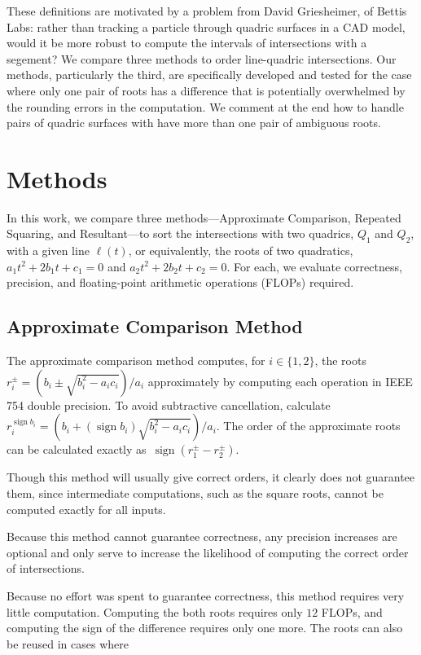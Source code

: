 \documentclass{cccg16}
\DeclareMathOperator{\sign}{sign}
\begin{document}
These definitions are motivated by a problem from David Griesheimer, of Bettis Labs:  rather than tracking a particle through quadric surfaces in a CAD model, would it be more robust to compute the intervals of intersections with a segement?  
We compare three methods to order line-quadric intersections.
Our methods, particularly the third,  are specifically 
developed and tested for the case where only one pair of roots has a difference
that is potentially overwhelmed by the rounding errors in the
computation. We comment at the end how to handle pairs of quadric
surfaces with have more than one pair of ambiguous roots.

\section{Methods}
In this work, we compare three  methods---Approximate Comparison,
Repeated Squaring, and Resultant---to sort the intersections with two quadrics, $Q_1$ and $Q_2$, with a given line $\ell(t)$, or equivalently, the roots of two quadratics, $a_1t^2+2b_1t+c_1=0$ and $a_2t^2+2b_2t+c_2=0$.  
For each, we evaluate correctness, precision, and floating-point arithmetic operations (FLOPs) required.

\subsection{Approximate Comparison Method}
The approximate comparison method computes, for $i\in\{1, 2\}$, the
roots~$r_i^\pm=({b_i\pm\sqrt{b_i^2-a_ic_i}})/{a_i}$ approximately by
computing each operation in IEEE 754 double precision.  To avoid subtractive cancellation, calculate
$r_i^{\sign b_i}=({b_i+(\sign{b_i})\sqrt{b_i^2-a_ic_i}})/{a_i}.$
The order of the approximate roots can be
calculated exactly as~$\sign(r_1^\pm-r_2^\pm)$.


Though this method will usually give correct orders, it clearly does
not guarantee them, since intermediate computations, such as the
square roots, cannot be computed exactly for all inputs.

Because this method cannot guarantee correctness, any precision
increases are optional and only serve to increase the likelihood of
computing the correct order of intersections.

Because no effort was spent to guarantee correctness, this method
requires very little computation.  Computing the both roots requires
only $12$ FLOPs, and computing the sign of the difference requires
only one more.  The roots can also be reused in cases where 
\end{document}
